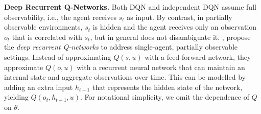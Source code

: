 \textbf{Deep Recurrent Q-Networks.} Both DQN and independent DQN assume full observability, i.e., the agent receives $s_t$ as input.
By contrast, in partially observable environments, $s_t$ is hidden and the agent receives only an observation $o_t$ that is correlated with $s_t$, but in general does not disambiguate it.
\citet{hausknecht2015deep}, propose the \emph{deep recurrent Q-networks} to address single-agent, partially observable settings.  Instead of approximating $Q(s,u)$ with a feed-forward network, they approximate $Q(o,u)$ with a recurrent neural network that can maintain an internal state and aggregate observations over time. This can be modelled by adding an extra input $h_{t-1}$ that represents the hidden state of the network, yielding $Q(o_t,h_{t-1},u)$. For notational simplicity, we omit the dependence of $Q$ on $\theta$.



